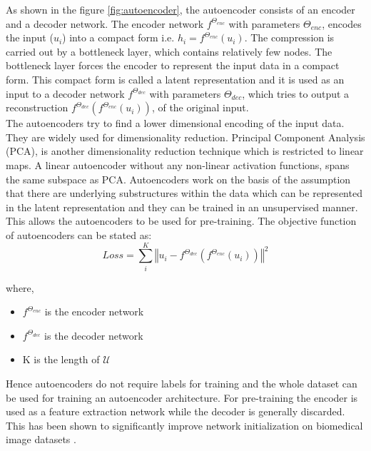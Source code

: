As shown in the figure \ref{fig:autoencoder}, the autoencoder consists of an encoder and a decoder network. The encoder network $f^{\Theta_{enc}}$ with parameters $\Theta_{enc}$, encodes the input ($u_i$) into a compact form i.e. $h_i = f^{\Theta_{enc}}(u_i)$. The compression is carried out by a bottleneck layer, which contains relatively few nodes. The bottleneck layer forces the encoder to represent the input data in a compact form. This compact form is called a latent representation and it is used as an input to a decoder network $f^{\Theta_{dec}}$ with parameters $\Theta_{dec}$, which tries to output a reconstruction $f^{\Theta_{dec}}(f^{\Theta_{enc}}(u_i))$, of the original input. \\
The autoencoders try to find a lower dimensional encoding of the input data. They are widely used for dimensionality reduction. Principal Component Analysis (PCA), is another dimensionality reduction technique which is restricted to linear maps. A linear autoencoder without any non-linear activation functions, spans the same subspace as PCA\cite{baldi1989}. Autoencoders work on the basis of the assumption that there are underlying substructures within the data which can be represented in the latent representation and they can be trained in an unsupervised manner. This allows the autoencoders to be used for pre-training.
The objective function of autoencoders can be stated as:
\begin{equation}
    \label{equation:autoencoders_loss}
    Loss = \sum_{i}^{K} \left\Vert u_i - f^{\Theta_{dec}}(f^{\Theta_{enc}}(u_i)) \right\Vert^2
\end{equation}

where,
\begin{itemize}[label={}]
  \setlength\itemsep{0em}
  \item $f^{\Theta_{enc}}$ is the encoder network
  \item $f^{\Theta_{dec}}$ is the decoder network
  \item K is the length of $\mathcal{U}$
\end{itemize}

Hence autoencoders do not require labels for training and the whole dataset can be used for training an autoencoder architecture. For pre-training the encoder is used as a feature extraction network while the decoder is generally discarded. This has been shown to significantly improve network initialization on biomedical image datasets \cite{ferreira2020}.

